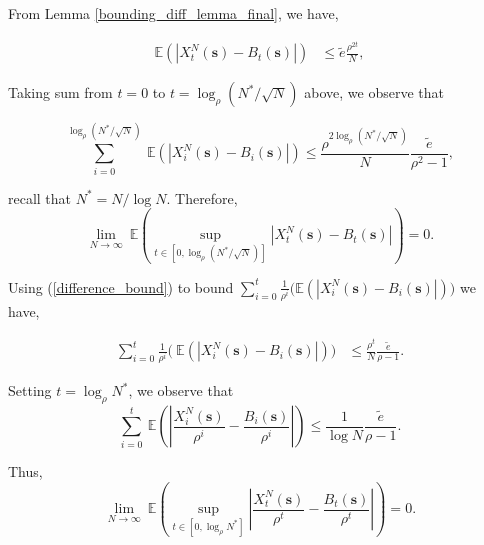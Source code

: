 \documentclass{article}
\theoremstyle{definition}
\newcommand{\lrp}[1]{\left({#1}\right)}
\newcommand{\abs}[1]{\left\lvert{#1}\right\rvert}
\newcommand{\Exp}[1]{\mathbb{E}\lrp{#1}}
\begin{document}
    From Lemma \ref{bounding_diff_lemma_final}, we have,

    \begin{equation}
      \begin{aligned}
        \Exp{\abs{{{X}}_t^N(\bm{s}) - {{B}}_t(\bm{s})}}    &\le \tilde{e} \frac{\rho^{2t}}{N} , 
        \label{difference_bound}
      \end{aligned}
    \end{equation}
    
    Taking sum from $t =0$ to  $t=\log_\rho (N^*/\sqrt{N})$ above, we observe that
    
     \[ \sum\limits_{i=0}^{\log_\rho (N^*/\sqrt{N})} ~\Exp{\abs{{{X}}^N_i(\bm{s}) - {{B}}_i(\bm{s})}} \leq  \frac{\rho^{2 \log_\rho (N^*/\sqrt{N})}}{N}\frac{\tilde{e}}{\rho^2-1},\]
    
   
    
    
   recall that $N^*=N/\log{N}$. Therefore,
    \[ \lim\limits_{N\rightarrow \infty} ~ \Exp{ \sup\limits_{t\in [0, \log_\rho (N^*/\sqrt{N})]} \abs{{{X}}_t^N(\bm{s}) - {{B}}_t(\bm{s})} } = 0 . \]

    
    
    
    
    
    
    Using (\ref{difference_bound}) to bound $\sum_{i=0}^{t}\frac{1}{\rho^i}\Big(  \mathbb{E}(\abs{{{X}}_{i}^N(\bm{s})-{{B}}_{i}(\bm{s})})\Big)$  we have,

    \begin{equation*}
    \begin{aligned}
    \sum_{i=0}^{t}\frac{1}{\rho^i}\Big(\  \mathbb{E}(\abs{{X}_{i}^N(\bm{s})-{B}_{i}(\bm{s})})\Big) &
     \leq  \frac{\rho^{t}}{N}  \frac{\tilde{e}}{\rho-1} .
    \label{eq:bound6}
   \end{aligned}
\end{equation*}
    
    Setting $t=\log_\rho N^*$, we observe that
    \[ \sum\limits_{i=0}^{t} ~\Exp{\abs{\frac{{X}^N_i(\bm{s})}{\rho^i} - \frac{{B}_i(\bm{s})}{\rho^i}}}  \leq \frac{1}{\log N}   \frac{\tilde{e}}{\rho-1}.\]
    
   Thus,
    \[ \lim\limits_{N\rightarrow\infty}  ~ \Exp{\sup\limits_{t\in [0,\log_\rho N^*]} \abs{\frac{{X}^N_t(\bm{s})}{\rho^t} - \frac{{B}_t(\bm{s})}{\rho^t}}} = 0. \]
\end{document}
